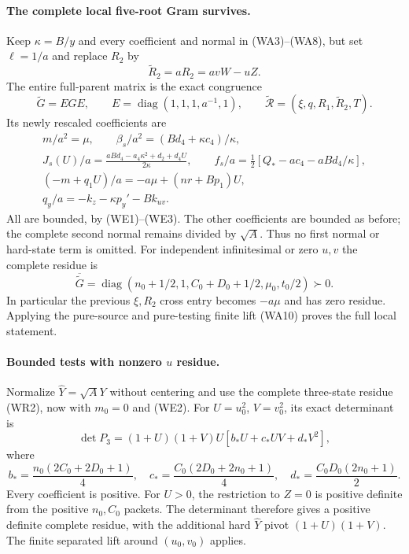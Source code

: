 \paragraph{The complete local five-root Gram survives.}
Keep $\kappa=B/y$ and every coefficient and normal in
(WA3)--(WA8), but set $\ell=1/a$ and replace $R_2$ by
\[
 \widetilde R_2=aR_2=avW-uZ.
\]
The entire full-parent matrix is the exact congruence
\[
 \widetilde G=EGE,\qquad E=\operatorname{diag}(1,1,1,a^{-1},1),
 \qquad \widetilde{\mathcal R}=(\xi,q,R_1,\widetilde R_2,T).
                                                               \tag{WE4}
\]
Its newly rescaled coefficients are
\[
\begin{gathered}
 m/a^2=\mu,\qquad
 \beta_s/a^2=(Bd_4+\kappa c_4)/\kappa,\\
 J_s(U)/a=\frac{aBd_4-a_4\kappa^2+d_2+d_4U}{2\kappa},\qquad
 f_s/a=\tfrac12[Q_*-ac_4-aBd_4/\kappa],\\
 (-m+q_1U)/a=-a\mu+(nr+Bp_1)U,\\
 q_y/a=-k_z-\kappa p_y'-Bk_{uv}.                  \end{gathered}\tag{WE5}
\]
All are bounded, by (WE1)--(WE3). The other coefficients are
bounded as before; the complete second normal remains divided
by $\sqrt A$. Thus no first normal or hard-state term is omitted.
For independent infinitesimal or zero $u,v$ the complete residue is
\[
 \overline{\widetilde G}
 =\operatorname{diag}(n_0+1/2,1,C_0+D_0+1/2,\mu_0,t_0/2)
 \succ0.                                               \tag{WE6}
\]
In particular the previous $\xi,R_2$ cross entry becomes
$-a\mu$ and has zero residue. Applying the pure-source and
pure-testing finite lift (WA10) proves the full local statement.

\paragraph{Bounded tests with nonzero $u$ residue.}
Normalize $\widehat Y=\sqrt A Y$ without centering and use the
complete three-state residue (WR2), now with $m_0=0$ and (WE2).
For $U=u_0^2$, $V=v_0^2$, its exact determinant is
\[
 \det P_3=(1+U)(1+V)U[b_*U+c_*UV+d_*V^2],             \tag{WE7}
\]
where
\[
 b_*=\frac{n_0(2C_0+2D_0+1)}4,\quad
 c_*=\frac{C_0(2D_0+2n_0+1)}4,\quad
 d_*=\frac{C_0D_0(2n_0+1)}2.
\]
Every coefficient is positive. For $U>0$, the restriction to
$Z=0$ is positive definite from the positive $n_0,C_0$ packets.
The determinant therefore gives a positive definite complete
residue, with the additional hard $\widehat Y$ pivot
$(1+U)(1+V)$. The finite separated lift around $(u_0,v_0)$ applies.

